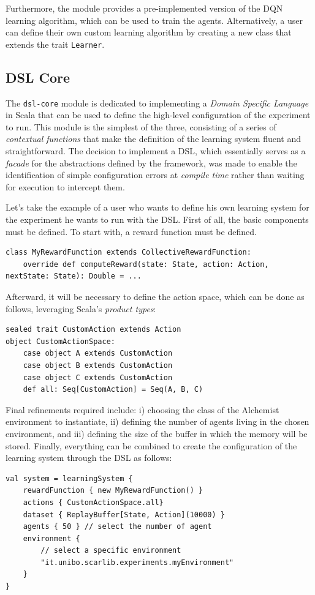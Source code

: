 \documentclass[12pt,a4paper,openright,twoside]{book}
\begin{document}
Furthermore, the module provides a pre-implemented version of the DQN \cite{dqn} learning algorithm, which can be used 
    to train the agents. Alternatively, a user can define their own custom learning algorithm by creating a
    new class that extends the trait \texttt{Learner}.

\subsection*{DSL Core}
The \texttt{dsl-core} module is dedicated to implementing a \emph{Domain Specific Language} in Scala that can be used to 
    define the high-level configuration of the experiment to run. This module is the simplest of the three, 
    consisting of a series of \emph{contextual functions} that make the definition of the learning system 
    fluent and straightforward.
    The decision to implement a DSL, which essentially serves as a \emph{facade} for the abstractions defined 
    by the framework, was made to enable the identification of simple configuration errors at \emph{compile time} rather than waiting
    for execution to intercept them.

Let's take the example of a user who wants to define his own learning system for the experiment he wants to run 
    with the DSL. First of all, the basic components must be defined. To start with, a reward 
    function must be defined.
    \begin{lstlisting}
class MyRewardFunction extends CollectiveRewardFunction:
    override def computeReward(state: State, action: Action, nextState: State): Double = ...
    \end{lstlisting}
    Afterward, it will be necessary to define the action space, which can be done as follows, 
    leveraging Scala's \emph{product types}:
    \begin{lstlisting}
sealed trait CustomAction extends Action
object CustomActionSpace:
    case object A extends CustomAction
    case object B extends CustomAction
    case object C extends CustomAction
    def all: Seq[CustomAction] = Seq(A, B, C)
    \end{lstlisting}
Final refinements required include: 
    i) choosing the class of the Alchemist environment to instantiate, 
    ii) defining the number of agents living in the chosen environment, and 
    iii) defining the size of the buffer in which the memory will be stored.
    Finally, everything can be combined to create the configuration of the learning system through the DSL 
    as follows:
\begin{lstlisting}
val system = learningSystem {
    rewardFunction { new MyRewardFunction() }
    actions { CustomActionSpace.all}
    dataset { ReplayBuffer[State, Action](10000) }
    agents { 50 } // select the number of agent
    environment {
        // select a specific environment
        "it.unibo.scarlib.experiments.myEnvironment"
    }
}
\end{lstlisting}
\end{document}
